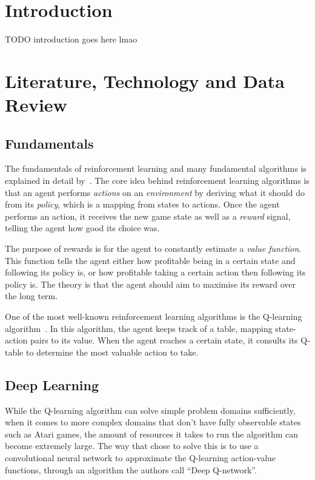 \documentclass[12pt,a4paper]{article}
\begin{document}

    \section{Introduction}\label{sec:introduction}
    TODO introduction goes here lmao

    \section{Literature, Technology and Data Review}\label{sec:literature-technology-and-data-review}

    \subsection{Fundamentals}\label{subsec:fundamentals}

    The fundamentals of reinforcement learning and many fundamental algorithms is explained in detail by~\citet{sutton18}.
    The core idea behind reinforcement learning algorithms is that an agent performs \emph{actions} on an \emph{environment} by deriving what it should do from its \emph{policy}, which is a mapping from states to actions.
    Once the agent performs an action, it receives the new game state as well as a \emph{reward} signal, telling the agent how good its choice was.

    The purpose of rewards is for the agent to constantly estimate a \emph{value function}.
    This function tells the agent either how profitable being in a certain state and following its policy is, or how profitable taking a certain action then following its policy is.
    The theory is that the agent should aim to maximise its reward over the long term.

    One of the most well-known reinforcement learning algorithms is the Q-learning algorithm~\citep[chap.~6.5]{sutton18}.
    In this algorithm, the agent keeps track of a table, mapping state-action pairs to its value.
    When the agent reaches a certain state, it consults its Q-table to determine the most valuable action to take.

    \subsection{Deep Learning}\label{subsec:deep-learning}
    While the Q-learning algorithm can solve simple problem domains sufficiently, when it comes to more complex domains that don't have fully observable states such as Atari games, the amount of resources it takes to run the algorithm can become extremely large.
    The way that \citet{mnih15} chose to solve this is to use a convolutional neural network to approximate the Q-learning action-value functions, through an algorithm the authors call ``Deep Q-network''.
\end{document}
